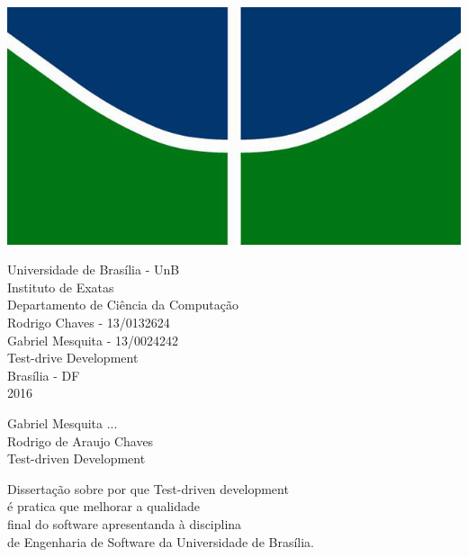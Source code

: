 \documentclass[12pt]{article}
\begin{document}
    \begin{center}
    \includegraphics[scale=0.5]{unb}
    \par
    \vspace{15mm}
    \normalsize{Universidade de Brasília - UnB}\\
    \normalsize{Instituto de Exatas}\\
    \normalsize{Departamento de Ciência da Computação}\\
    \vspace{15mm}
    \normalsize{Rodrigo Chaves - 13/0132624}\\
    \normalsize{Gabriel Mesquita - 13/0024242}\\
    \vspace{15mm}
    \Huge{Test-drive Development}\\

    \vspace{60mm}
    \normalsize{Brasília - DF}\\
    \textnormal{2016}
  \end{center}

  \clearpage

  \begin{center}
    Gabriel Mesquita ...\\
    Rodrigo de Araujo Chaves\\
    \vspace{30mm}
    \Huge{Test-driven Development}
    \vspace{30mm}
    \normalsize{}
    \begin{flushright}
      Dissertação sobre por que Test-driven development\\
      é pratica que melhorar a qualidade\\
      final do software apresentanda à disciplina\\
      de Engenharia de Software da Universidade de Brasília.\\
    \end{flushright}
  \end{center}
\end{document}
